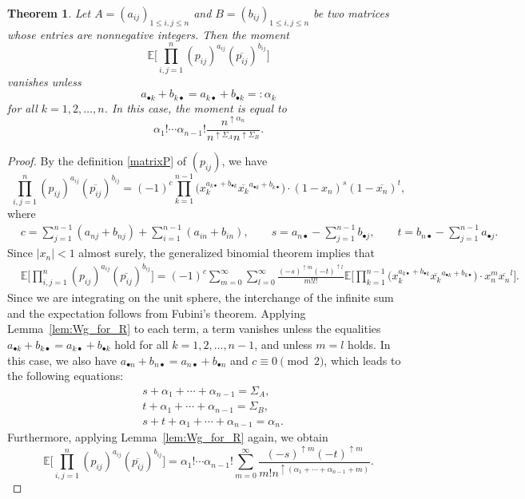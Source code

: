 \documentclass[10pt,a4paper]{amsart}
\numberwithin{equation}{section}
\newtheorem{Theorem}{Theorem}[section]
\theoremstyle{definition}
\begin{document}
\begin{Theorem} \label{thm:momentsP2}
Let $A=(a_{ij})_{1 \le i,j \le n}$ and $B=(b_{ij})_{1 \le i,j \le n}$ be two matrices whose entries are nonnegative integers.
Then the moment
\[
\mathbb{E} \Biggl[\prod_{i,j=1}^n (p_{ij})^{a_{ij}} (\overline{p_{ij}})^{b_{ij}} \Biggr]
\]
vanishes unless
\[
a_{\bullet k} + b_{k \bullet} = a_{k \bullet} + b_{\bullet k } =:\alpha_k
\]
for all $k=1,2,\dots, n$.
In this case, the moment is equal to
\[
 \alpha_1! \cdots \alpha_{n-1}!
\frac{n^{\uparrow \alpha_n}}{n^{\uparrow \Sigma_A} n^{\uparrow \Sigma_B}}.
\]
\end{Theorem}


\begin{proof}
By the definition \eqref{matrixP} of $(p_{ij})$, we have
\[
\prod_{i,j=1}^n (p_{ij})^{a_{ij}} (\overline{p_{ij}})^{b_{ij}}
= (-1)^c
\prod_{k=1}^{n-1}
\bigl( x_k^{a_{k \bullet}+b_{\bullet k}} \overline{x_k}^{a_{\bullet k} +b_{k \bullet}} \bigr)
\cdot (1-x_n)^{s} (1-\overline{x_n})^{t},
\]
where
\begin{align*}
&c= \sum_{j=1}^{n-1} (a_{nj}+b_{nj}) + \sum_{i=1}^{n-1} (a_{in}+b_{in}), \qquad
s = a_{n \bullet} -\sum_{j=1}^{n-1} b_{\bullet j}, \qquad
t = b_{n \bullet} -\sum_{j=1}^{n-1} a_{\bullet j}.
\end{align*}
Since $|x_n|<1$ almost surely,
the generalized binomial theorem implies that
\begin{align*}
&\mathbb{E} \Biggl[ \prod_{i,j=1}^n (p_{ij})^{a_{ij}} (\overline{p_{ij}})^{b_{ij}} \Biggr]
 = (-1)^{c}
 \sum_{m=0}^\infty\sum_{l=0}^\infty\frac{(-s)^{\uparrow m}(-t)^{\uparrow l}}{m! l! }
\mathbb{E} \Biggl[\prod_{k=1}^{n-1} \bigl( x_k^{a_{k \bullet}+b_{\bullet k}}
\overline{x_k}^{a_{\bullet k}+b_{k \bullet}} \bigr)
\cdot x_n^{m} \overline{x_n}^{l} \Biggr].
\end{align*}
Since we are integrating on the unit sphere, the interchange of the infinite sum and the expectation follows from Fubini's theorem.
Applying Lemma~\ref{lem:Wg_for_R} to each term, a term vanishes unless the equalities
$a_{\bullet k} + b_{k \bullet} = a_{k \bullet} + b_{\bullet k }$ hold for all $k=1,2,\dots,n-1$, and unless $m=l$ holds.
In this case, we also have $a_{\bullet n} + b_{n \bullet} = a_{n \bullet} + b_{\bullet n}$ and
$c \equiv 0 \pmod{2}$, which leads to the following equations:
\begin{equation} \label{eq:alpha_Sigma}
\begin{aligned}
&s+\alpha_1+ \cdots+ \alpha_{n-1}= \Sigma_A, \\
&t+\alpha_1+ \cdots+ \alpha_{n-1}= \Sigma_B, \\
&s+t+\alpha_1+ \cdots+ \alpha_{n-1}= \alpha_n.
\end{aligned}
\end{equation}
Furthermore, applying Lemma~\ref{lem:Wg_for_R} again, we obtain
\[
\mathbb{E} \Biggl[ \prod_{i,j=1}^n (p_{ij})^{a_{ij}} (\overline{p_{ij}})^{b_{ij}} \Biggr]
= \alpha_1 ! \cdots \alpha_{n-1}! \sum_{m=0}^\infty \frac{(-s)^{\uparrow m}(-t)^{\uparrow m}}{m! n^{\uparrow (\alpha_1+ \cdots+ \alpha_{n-1}+m)}}.
\]


\end{proof}
\end{document}
